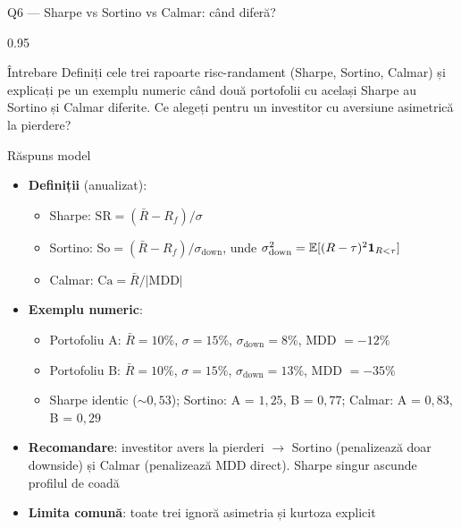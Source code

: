 \documentclass[9pt, aspectratio=169, t]{beamer}
\begin{document}
\begin{frame}[shrink=25]{Q6 --- Sharpe vs Sortino vs Calmar: când diferă?}
\begin{cminipage}{0.95\textwidth}
\begin{block}{Întrebare}
Definiți cele trei rapoarte risc-randament (Sharpe, Sortino, Calmar) și explicați pe un exemplu numeric când două portofolii cu același Sharpe au Sortino și Calmar diferite. Ce alegeți pentru un investitor cu aversiune asimetrică la pierdere?
\end{block}
\begin{exampleblock}{Răspuns model}
\begin{itemize}\setlength{\itemsep}{0pt}
    \item \textbf{Definiții} (anualizat):
    \begin{itemize}\setlength{\itemsep}{0pt}
        \item Sharpe: $\text{SR} = (\bar R - R_f)/\sigma$
        \item Sortino: $\text{So} = (\bar R - R_f)/\sigma_{\text{down}}$, unde $\sigma_{\text{down}}^2 = \mathbb{E}[(R - \tau)^2 \mathbf{1}_{R < \tau}]$
        \item Calmar: $\text{Ca} = \bar R / |\text{MDD}|$
    \end{itemize}
    \item \textbf{Exemplu numeric}:
    \begin{itemize}\setlength{\itemsep}{0pt}
        \item Portofoliu A: $\bar R = 10\%$, $\sigma = 15\%$, $\sigma_{\text{down}} = 8\%$, MDD $= -12\%$
        \item Portofoliu B: $\bar R = 10\%$, $\sigma = 15\%$, $\sigma_{\text{down}} = 13\%$, MDD $= -35\%$
        \item Sharpe identic ($\sim 0{,}53$); Sortino: A = $1{,}25$, B = $0{,}77$; Calmar: A = $0{,}83$, B = $0{,}29$
    \end{itemize}
    \item \textbf{Recomandare}: investitor avers la pierderi $\to$ Sortino (penalizează doar downside) și Calmar (penalizează MDD direct). Sharpe singur ascunde profilul de coadă
    \item \textbf{Limita comună}: toate trei ignoră asimetria și kurtoza explicit
\end{itemize}
\end{exampleblock}
\end{cminipage}
\end{frame}

\end{document}
